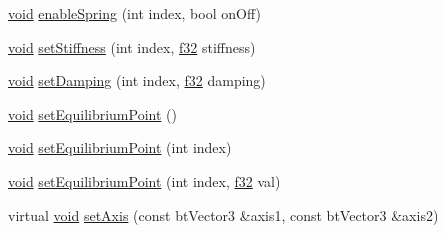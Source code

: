 \begin{DoxyCompactItemize}
\item 
\mbox{\hyperlink{_thread_8h_af1e856da2e658414cb2456cb6f7ebc66}{void}} \mbox{\hyperlink{classnjli_1_1_physics_constraint_generic6_dof_spring_ac9ee86dda7ea98b3e06130e5cc07a1d9}{enable\+Spring}} (int index, bool on\+Off)
\item 
\mbox{\hyperlink{_thread_8h_af1e856da2e658414cb2456cb6f7ebc66}{void}} \mbox{\hyperlink{classnjli_1_1_physics_constraint_generic6_dof_spring_a21ba981d8b8c8a7ea383e99c94ecf2e0}{set\+Stiffness}} (int index, \mbox{\hyperlink{_util_8h_a5f6906312a689f27d70e9d086649d3fd}{f32}} stiffness)
\item 
\mbox{\hyperlink{_thread_8h_af1e856da2e658414cb2456cb6f7ebc66}{void}} \mbox{\hyperlink{classnjli_1_1_physics_constraint_generic6_dof_spring_afd76f8cca3ad0d36b0426c2ee8ed2842}{set\+Damping}} (int index, \mbox{\hyperlink{_util_8h_a5f6906312a689f27d70e9d086649d3fd}{f32}} damping)
\item 
\mbox{\hyperlink{_thread_8h_af1e856da2e658414cb2456cb6f7ebc66}{void}} \mbox{\hyperlink{classnjli_1_1_physics_constraint_generic6_dof_spring_a40d2ff0ac7576828303e9865f720454c}{set\+Equilibrium\+Point}} ()
\item 
\mbox{\hyperlink{_thread_8h_af1e856da2e658414cb2456cb6f7ebc66}{void}} \mbox{\hyperlink{classnjli_1_1_physics_constraint_generic6_dof_spring_a15198ee1c2433da2bee647c18b06b891}{set\+Equilibrium\+Point}} (int index)
\item 
\mbox{\hyperlink{_thread_8h_af1e856da2e658414cb2456cb6f7ebc66}{void}} \mbox{\hyperlink{classnjli_1_1_physics_constraint_generic6_dof_spring_ad29953e4752e238af691d92da16673d1}{set\+Equilibrium\+Point}} (int index, \mbox{\hyperlink{_util_8h_a5f6906312a689f27d70e9d086649d3fd}{f32}} val)
\item 
virtual \mbox{\hyperlink{_thread_8h_af1e856da2e658414cb2456cb6f7ebc66}{void}} \mbox{\hyperlink{classnjli_1_1_physics_constraint_generic6_dof_spring_ac8d968dd1b3e929978635ec8fcdf8238}{set\+Axis}} (const bt\+Vector3 \&axis1, const bt\+Vector3 \&axis2)
\end{DoxyCompactItemize}
